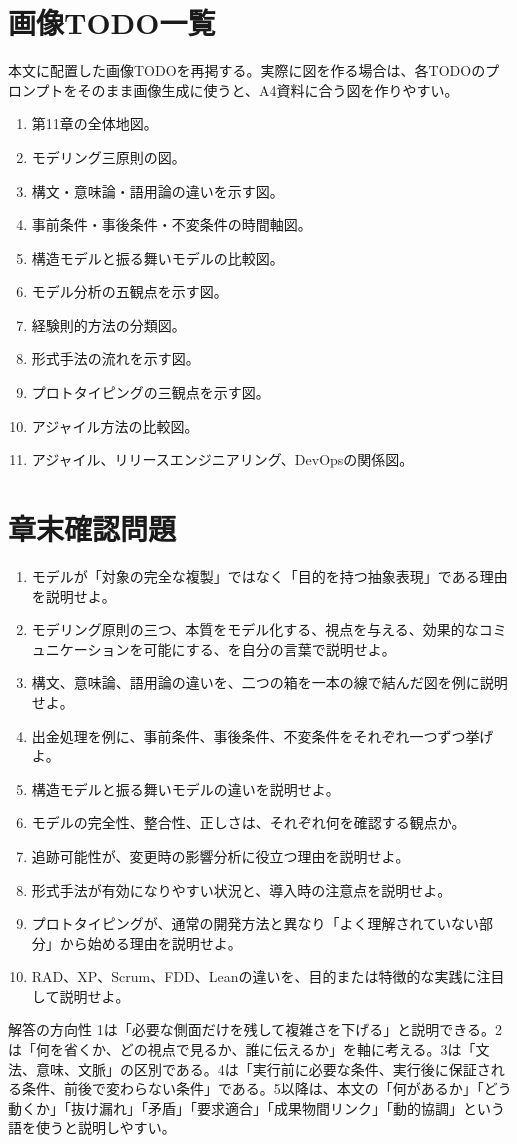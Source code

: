 \documentclass[a4paper,11pt]{ltjsarticle}
\begin{document}
\section{画像TODO一覧}
本文に配置した画像TODOを再掲する。実際に図を作る場合は、各TODOのプロンプトをそのまま画像生成に使うと、A4資料に合う図を作りやすい。
\begin{enumerate}
  \item 第11章の全体地図。
  \item モデリング三原則の図。
  \item 構文・意味論・語用論の違いを示す図。
  \item 事前条件・事後条件・不変条件の時間軸図。
  \item 構造モデルと振る舞いモデルの比較図。
  \item モデル分析の五観点を示す図。
  \item 経験則的方法の分類図。
  \item 形式手法の流れを示す図。
  \item プロトタイピングの三観点を示す図。
  \item アジャイル方法の比較図。
  \item アジャイル、リリースエンジニアリング、DevOpsの関係図。
\end{enumerate}

\section{章末確認問題}
\begin{enumerate}
  \item モデルが「対象の完全な複製」ではなく「目的を持つ抽象表現」である理由を説明せよ。
  \item モデリング原則の三つ、本質をモデル化する、視点を与える、効果的なコミュニケーションを可能にする、を自分の言葉で説明せよ。
  \item 構文、意味論、語用論の違いを、二つの箱を一本の線で結んだ図を例に説明せよ。
  \item 出金処理を例に、事前条件、事後条件、不変条件をそれぞれ一つずつ挙げよ。
  \item 構造モデルと振る舞いモデルの違いを説明せよ。
  \item モデルの完全性、整合性、正しさは、それぞれ何を確認する観点か。
  \item 追跡可能性が、変更時の影響分析に役立つ理由を説明せよ。
  \item 形式手法が有効になりやすい状況と、導入時の注意点を説明せよ。
  \item プロトタイピングが、通常の開発方法と異なり「よく理解されていない部分」から始める理由を説明せよ。
  \item RAD、XP、Scrum、FDD、Leanの違いを、目的または特徴的な実践に注目して説明せよ。
\end{enumerate}

\begin{pointbox}{解答の方向性}
1は「必要な側面だけを残して複雑さを下げる」と説明できる。2は「何を省くか、どの視点で見るか、誰に伝えるか」を軸に考える。3は「文法、意味、文脈」の区別である。4は「実行前に必要な条件、実行後に保証される条件、前後で変わらない条件」である。5以降は、本文の「何があるか」「どう動くか」「抜け漏れ」「矛盾」「要求適合」「成果物間リンク」「動的協調」という語を使うと説明しやすい。
\end{pointbox}
\end{document}
